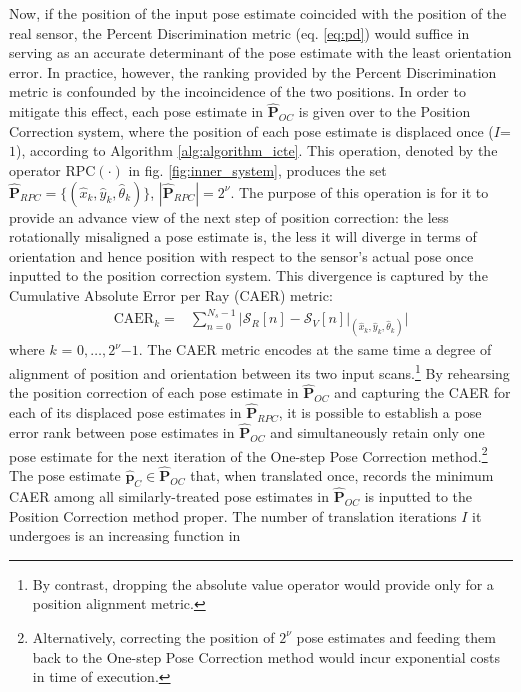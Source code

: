 Now, if the position of the input pose estimate coincided with the position of
the real sensor, the Percent Discrimination metric (eq. \ref{eq:pd}) would
suffice in serving as an accurate determinant of the pose estimate with the
least orientation error. In practice, however, the ranking provided by the
Percent Discrimination metric is confounded by the incoincidence of the two
positions.  In order to mitigate this effect, each pose estimate in
$\hat{\bm{P}}_{OC}$ is given over to the Position Correction system, where the
position of each pose estimate is displaced once ($I$=$1$), according to
Algorithm \ref{alg:algorithm_icte}. This operation, denoted by the operator
RPC$(\cdot)$ in fig. \ref{fig:inner_system}, produces the set
$\hat{\bm{P}}_{RPC} = \{(\hat{x}_k, \hat{y}_k, \hat{\theta}_k)\}$,
$|\hat{\bm{P}}_{RPC}| = 2^\nu$.  The purpose of this operation is for it to
provide an advance view of the next step of position correction: the less
rotationally misaligned a pose estimate is, the less it will diverge in terms of
orientation and hence position with respect to the sensor's actual pose once
inputted to the position correction system. This divergence is captured by the
Cumulative Absolute Error per Ray (CAER) metric:
\begin{align}
  \text{CAER}_k = & \sum\limits_{n=0}^{N_s-1} \Bigg| \mathcal{S}_R[n] - \mathcal{S}_V[n]\Big|_{(\hat{x}_k, \hat{y}_k, \hat{\theta}_k)} \Bigg|
\end{align}
where $k$ = $0,\dots,2^\nu$$-$$1$. The CAER metric encodes at the same time a degree
of alignment of position and orientation between its two input
scans.\footnote{By contrast, dropping the absolute value operator would provide
only for a position alignment metric.} By rehearsing the position correction of
each pose estimate in $\hat{\bm{P}}_{OC}$ and capturing the CAER for each of
its displaced pose estimates in $\hat{\bm{P}}_{RPC}$, it is possible to
establish a pose error rank between pose estimates in $\hat{\bm{P}}_{OC}$ and
simultaneously retain only one pose estimate for the next iteration of the
One-step Pose Correction method.\footnote{Alternatively, correcting the
position of $2^\nu$ pose estimates and feeding them back to the One-step Pose
Correction method would incur exponential costs in time of execution.} The pose
estimate $\hat{\bm{p}}_C \in \hat{\bm{P}}_{OC}$ that, when translated once,
records the minimum CAER among all similarly-treated pose estimates in
$\hat{\bm{P}}_{OC}$ is inputted to the Position Correction method proper. The
number of translation iterations $I$ it undergoes is an increasing function in
